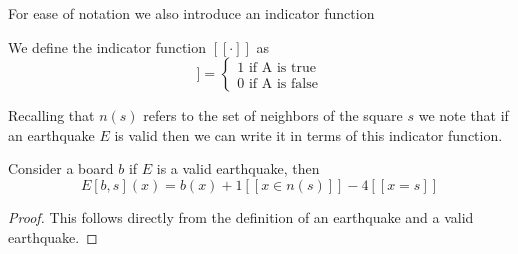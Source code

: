 \documentclass[runningheads,a4paper]{llncs}
\begin{document}
For ease of notation we also introduce an indicator function
\begin{definition}
We define the indicator function $[[\cdot]]$ as 
\begin{equation*}
[[A]] = \begin{cases} 1 \text{ if A is true} \\ 0 \text{ if A is false} \end{cases}
\end{equation*}
\end{definition}

Recalling that $n(s)$ refers to the set of neighbors of the square $s$ we note that if an earthquake $E$ is valid then we can write it in terms of this indicator function.
\begin{lemma} 
\label{earthquakeredefine}
Consider a board $b$ if $E$ is a valid earthquake, then 
\begin{equation*}
E[b, s](x) = b(x) + 1[[ x \in n(s)]] - 4[[x =s]]
\end{equation*}
\end{lemma}
\begin{proof}
This follows directly from the definition of an earthquake and a valid earthquake. 
\end{proof}
\end{document}
